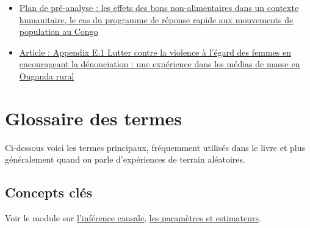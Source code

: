 \documentclass[
  12pt,
]{book}
\begin{document}
\begin{itemize}
\item
  \href{https://osf.io/eutx7/}{Plan de pré-analyse : les effets des bons non-alimentaires dans un contexte humanitaire, le cas du programme de réponse rapide aux mouvements de population au Congo}
\item
  \href{http://jasper-cooper.com/papers/Green_et_al.pdf}{Article : Appendix E.1 Lutter contre la violence à l'égard des femmes en encourageant la dénonciation : une expérience dans les médias de masse en Ouganda rural}
\end{itemize}

\cleardoublepage

\hypertarget{appendix-appendix}{%
\appendix}


\hypertarget{glossaire-des-termes}{%
\chapter{Glossaire des termes}\label{glossaire-des-termes}}

Ci-dessous voici les termes principaux, fréquemment utilisés dans le livre et plus généralement quand on parle d'expériences de terrain aléatoires.

\hypertarget{concepts-cluxe9s}{%
\section{Concepts clés}\label{concepts-cluxe9s}}

Voir le module sur \href{inférence-causale.html}{l'inférence causale}, \href{paramètres-et-estimateurs.html}{les paramètres et estimateurs}.
\end{document}
